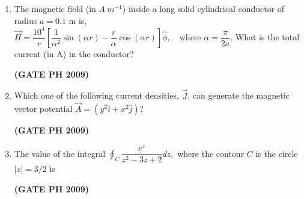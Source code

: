 \documentclass[14pt, a4paper]{extarticle}
\renewcommand{\vec}[1]{\overrightarrow{#1}}
\begin{document}
\begin{enumerate}[label=\textbf{Q. \arabic*}, start=21]

\item The magnetic field (in $A~m^{-1}$) inside a long solid cylindrical conductor of radius $a = 0.1$ m is,
$ \vec{H} = \dfrac{10^4}{r} \left[ \dfrac{1}{\alpha^2}\sin(\alpha r) - \dfrac{r}{\alpha}\cos(\alpha r) \right] \hat{\phi}, \quad \text{where } \alpha = \dfrac{\pi}{2a}. $
What is the total current (in A) in the conductor?
\begin{enumerate}
\end{enumerate}
\hfill \textbf{(GATE PH 2009)}

\item Which one of the following current densities, $\vec{J}$, can generate the magnetic vector potential $\vec{A} = (y^2\hat{i} + x^2\hat{j})$?
\begin{enumerate}
\end{enumerate}
\hfill \textbf{(GATE PH 2009)}

\item The value of the integral $\oint_C \dfrac{e^z}{z^2 - 3z + 2} dz,$
where the contour $C$ is the circle $|z| = 3/2$ is
\begin{enumerate}
\end{enumerate}
\hfill \textbf{(GATE PH 2009)}


\end{enumerate}
\end{document}
